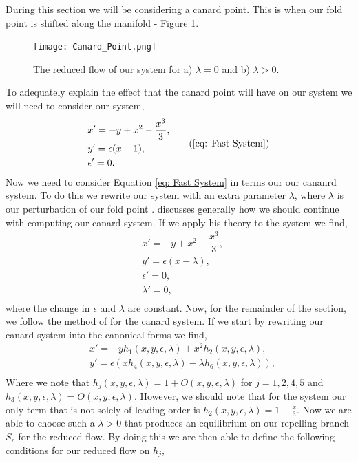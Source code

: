 
During this section we will be considering a canard point. This is when our fold point is shifted along the manifold - Figure \ref{fig: Canard Point}. 
\begin{figure}[h!]
	\centering
	\texttt{[image: Canard\_Point.png]}
	\caption{The reduced flow of our system for a) $\lambda=0$ and b) $\lambda>0$.}
	\label{fig: Canard Point}
\end{figure}
To adequately explain the effect that the canard point will have on our system we will need to consider our system,
\begin{equation}
\begin{aligned}
&x'=-y+x^2-\dfrac{x^3}{3},\\
&y'=\epsilon(x-1),\\
&\epsilon'=0.\\
\end{aligned}
\tag{\ref{eq: Fast System}}
\end{equation}
Now we need to consider Equation \ref{eq: Fast System} in terms our our cananrd system. To do this we rewrite our system with an extra parameter $\lambda$, where $\lambda$ is our perturbation of our fold point \citep{krupa2001}. \citet{krupa2001} discusses generally how we should continue with computing our canard system. If we apply his theory to the \vdp system we find,
\begin{equation}
\begin{aligned}
&x'=-y+x^2-\dfrac{x^3}{3},\\
&y'=\epsilon(x-\lambda),\\
&\epsilon'=0,\\
&\lambda'=0,\\
\end{aligned}
\label{eq: canard system}
\end{equation}
where the change in $\epsilon$ and $\lambda$ are constant. Now, for the remainder of the section, we follow the method of \citet{krupa2001} for the canard system. If we start by rewriting our canard system into the canonical forms we find,
\begin{align}
&x'=-yh_1(x,y,\epsilon,\lambda)+x^2h_2(x,y,\epsilon,\lambda),\\
&y'=\epsilon(xh_4(x,y,\epsilon,\lambda)-\lambda h_6(x,y,\epsilon,\lambda)),\\
\end{align}
Where we note that $h_j(x,y,\epsilon,\lambda)=1+O(x,y,\epsilon,\lambda)$ for $j=1,2,4,5$ and $h_3(x,y,\epsilon,\lambda)=O(x,y,\epsilon,\lambda)$. However, we should note that for the \vdp system our only term that is not solely of leading order is $h_2(x,y,\epsilon,\lambda)=1-\frac{x}{3}$. Now we are able to choose such a $\lambda>0$ that produces an equilibrium on our repelling branch $S_r$ for the reduced flow. By doing this we are then able to define the following conditions for our reduced flow on $h_j$,
